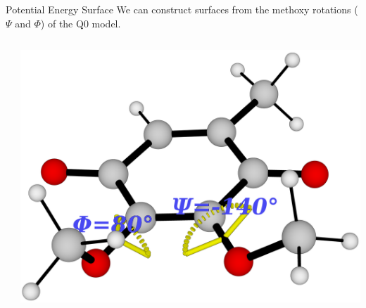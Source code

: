 \documentclass[9pt,t,xcolor=table]{beamer}
\begin{document}
\begin{frame}{\huge Potential Energy Surface}\large
	We can construct surfaces from the methoxy rotations ($\Psi$ and $\Phi$) of the Q0 model.
	\begin{columns}
		\begin{column}[c]{0.5\textwidth}
			\centering
			
			\vspace{10pt}
		\end{column}
		\begin{column}[c]{0.5\textwidth}
			\centering
			\includegraphics[width=1\textwidth]{Figs/dihedrals.png}
			\vspace{20pt}
		\end{column}
	\end{columns}
\end{frame}
\end{document}
